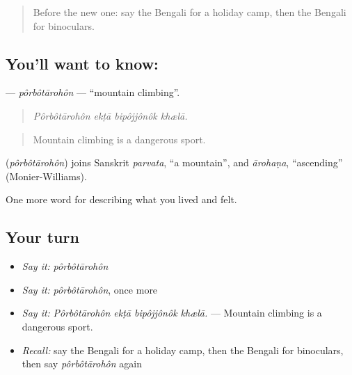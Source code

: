 \label{lesson:BN-C523-porbotarohon}



\begin{quote}
Before the new one: say the Bengali for a holiday camp, then the Bengali for binoculars.
\end{quote}

\subsection*{You'll want to know: }
\textbf{} — \emph{pôrbôtārohôn} — \textquotedblleft{}mountain climbing\textquotedblright{}.

\begin{quote}
   
\end{quote}

\begin{quote}
\emph{Pôrbôtārohôn ekṭā bipôjjônôk khælā.}
\end{quote}

\begin{quote}
Mountain climbing is a dangerous sport.
\end{quote}

\begin{cousinweb}
\textbf{} (\emph{pôrbôtārohôn}) joins Sanskrit \emph{parvata}, \textquotedblleft{}a mountain\textquotedblright{}, and \emph{ārohaṇa}, \textquotedblleft{}ascending\textquotedblright{} (Monier-Williams).
\end{cousinweb}

\begin{grammarlens}[title={What you've built}]
One more word for describing what you lived and felt.
\end{grammarlens}

\subsection*{Your turn}
\begin{itemize}
\raggedright
  \item \emph{Say it:} \emph{pôrbôtārohôn}
  \item \emph{Say it:} \emph{pôrbôtārohôn}, once more
  \item \emph{Say it:} \emph{Pôrbôtārohôn ekṭā bipôjjônôk khælā.} — Mountain climbing is a dangerous sport.
  \item \emph{Recall:} say the Bengali for a holiday camp, then the Bengali for binoculars, then say \emph{pôrbôtārohôn} again
\end{itemize}

